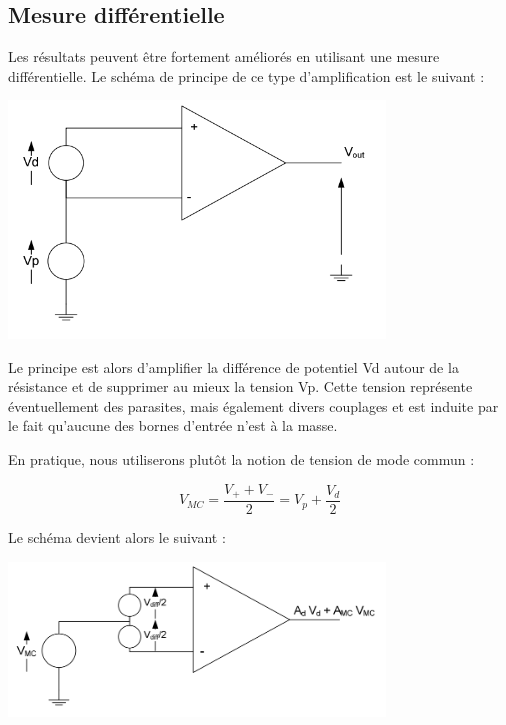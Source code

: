 \documentclass{../template/labo}
\begin{document}


\subsection{Mesure différentielle}

Les résultats peuvent être fortement améliorés en utilisant une mesure différentielle.
Le schéma de principe de ce type d'amplification est le suivant :

\begin{center}
\includegraphics[width=10cm]{sch4}
\end{center}

Le principe est alors d'amplifier la différence de potentiel Vd autour de la résistance et de supprimer
au mieux la tension Vp. Cette tension représente éventuellement des parasites, mais également divers
couplages et est induite par le fait qu'aucune des bornes d'entrée n'est à la masse.

En pratique, nous utiliserons plutôt la notion de tension de mode commun :

$$V_{MC}=\frac{V_+ + V_-}{2} = V_p + \frac{V_d}{2}$$

Le schéma devient alors le suivant :

\begin{center}
\includegraphics[width=10cm]{sch5}
\end{center}
\end{document}
